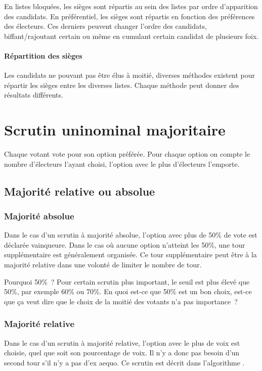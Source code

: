 \documentclass[../report]{subfiles}
\begin{document}
  En listes bloquées, les sièges sont répartis au sein des listes par ordre d'apparition 
  des candidats.
  En préférentiel, les sièges sont répartis en fonction des préférences des électeurs.
  Ces derniers peuvent changer l'ordre des candidats, biffant/rajoutant certain ou même
  en cumulant certain candidat de plusieurs foix.
  
  \paragraph{Répartition des sièges}

  Les candidats ne pouvant pas être élus à moitié, diverses méthodes existent pour répartir
  les sièges entre les diverses listes.
  Chaque méthode peut donner des résultats différents.
  
  \section{Scrutin uninominal majoritaire}\label{diff:scrutin-majoritaire}
  
  Chaque votant vote pour son option préférée.
  Pour chaque option on compte le nombre d'électeurs l'ayant choisi, l'option avec le plus 
  d'électeurs l'emporte.
  
  \subsection{Majorité relative ou absolue}
  \subsubsection{Majorité absolue}
  Dans le cas d'un scrutin à majorité absolue, l'option avec plus de 50\% de vote est déclarée
  vainqueure.
  Dans le cas où aucune option n'atteint les 50\%, une tour supplémentaire est généralement
  organisée.
  Ce tour supplémentaire peut être à la majorité relative dans une volonté de limiter le nombre
  de tour.
  
  \begin{nota}{Pourquoi 50\%~?}
    Pour certain scrutin plus important, le seuil est plus élevé que 50\%, par exemple 60\% ou 70\%. 
    En quoi est-ce que 50\% est un bon choix, est-ce que ça veut dire que le choix de la moitié
    des votants n'a pas importance~? 
  \end{nota}
  
  \subsubsection{Majorité relative}
  Dans le cas d'un scrutin à majorité relative, l'option avec le plus de voix est choisie, 
  quel que soit son pourcentage de voix. Il n'y a donc pas besoin d'un second tour s'il n'y 
  a pas d'ex aequo. Ce scrutin est décrit dans l'algorithme .
\end{document}
